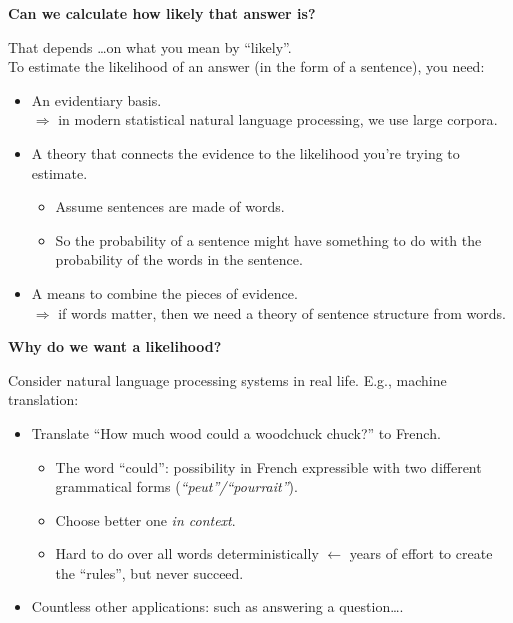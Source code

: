 \documentclass{beamer}
\newcommand{\pagestepalt}[2]{
  \begin{frame}[t]
    \begin{minipage}[t][0.26\textheight][t]{\textwidth}
      \begin{center}
        \huge
        \textbf{#1}
      \end{center}
    \end{minipage}
    
    \begin{minipage}[t][0.7\textheight][t]{\textwidth}
      #2
    \end{minipage}
  \end{frame}
}
\begin{document}
\pagestepalt{Can we calculate how \alert{likely} that answer is?}{
  \pause That depends \ldots on what you mean by ``likely''.\pause\\ To
  estimate the likelihood of an answer (in the form of a sentence),
  you need:
  \begin{itemize}
  \item An evidentiary basis.
    \\$\Rightarrow$ in modern \alert{statistical} natural language processing,
    we use large \alert{corpora}. \pause 
  \item A theory that connects the evidence to the likelihood you're
    trying to estimate.  \pause
    \begin{itemize}
    \item Assume sentences are made of words.  
    \item So the probability of a sentence might have something 
      to do with the probability of the words in the sentence.
    \end{itemize}\pause
  \item A means to combine the pieces of evidence.\\
    $\Rightarrow$ if words matter, then we need a \alert{theory} of sentence
    structure from words.
  \end{itemize}
}

\pagestepalt{Why do we want a likelihood?}{
  Consider natural language processing systems in real life. E.g., machine 
  translation:
  \begin{itemize}
  \item Translate ``How much wood \alert{could} a woodchuck chuck?'' to French.
    \begin{itemize}
    \item The word ``could'': possibility in French expressible with 
      two different grammatical forms ({\it ``peut''/``pourrait''}).
    \item Choose better one {\it in context}.
    \item Hard to do over all words deterministically $\leftarrow$
      years of effort to create the ``rules'', but never succeed.
    \end{itemize}
  \item Countless other applications: such as answering a question\ldots.
  \end{itemize}
}
\end{document}
